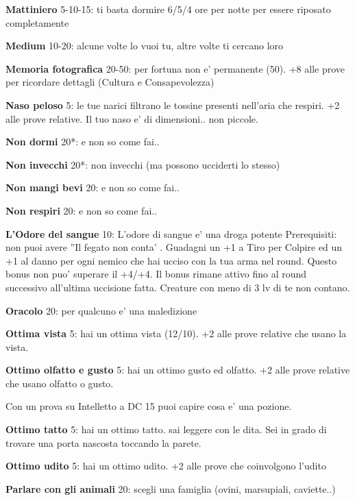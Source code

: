 \documentclass[a4paper,11pt,twoside,openany]{book}
\begin{document}
	\textbf{Mattiniero} 5-10-15: ti basta dormire 6/5/4 ore per notte
	per essere riposato completamente
	
	\textbf{Medium} 10-20: alcune volte lo vuoi tu, altre volte ti cercano loro
	
	\textbf{Memoria fotografica} 20-50: per fortuna non e' permanente (50). +8 alle prove per ricordare dettagli (Cultura e Consapevolezza)
	
	\textbf{Naso peloso} 5: le tue narici filtrano le tossine presenti nell'aria che respiri. +2 alle prove relative. Il tuo naso e' di dimensioni.. non piccole.
	
	\textbf{Non dormi} 20{*}: e non so come fai..
	
	\textbf{Non invecchi} 20{*}: non invecchi (ma possono ucciderti lo stesso)
	
	\textbf{Non mangi bevi} 20: e non so come fai..
	
	\textbf{Non respiri} 20: e non so come fai..
	
	\textbf{L'Odore del sangue} 10: L'odore di sangue e' una droga potente
	Prerequisiti: non puoi avere ''Il fegato non conta' . Guadagni un +1 a Tiro per Colpire ed un +1 al danno per ogni nemico che hai ucciso con la tua arma nel round. Questo bonus non puo' superare il +4/+4. Il bonus rimane attivo fino al round successivo all'ultima uccisione fatta. Creature con meno di 3 lv di te non contano.
	
	\textbf{Oracolo} 20: per qualcuno e' una maledizione
	
	\textbf{Ottima vista} 5: hai un ottima vista (12/10). +2 alle prove relative che usano la vista.
	
	\textbf{Ottimo olfatto e gusto} 5: hai un ottimo gusto ed olfatto. +2 alle prove relative che usano olfatto o gusto.
	
	Con un prova su Intelletto a DC 15 puoi capire cosa e' una pozione.
	
	\textbf{Ottimo tatto} 5: hai un ottimo tatto. sai leggere con le dita. Sei in grado di trovare una porta nascosta toccando la parete.
	
	\textbf{Ottimo udito} 5: hai un ottimo udito. +2 alle prove che coinvolgono l'udito
	
	\textbf{Parlare con gli animali} 20: scegli una famiglia (ovini, marsupiali, caviette..)
	
\end{document}
